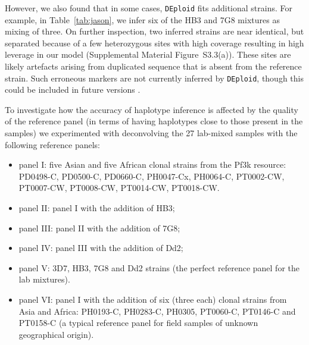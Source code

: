 \documentclass{bioinfo}
\begin{document}
However, we also found that in some cases, \texttt{DEploid} fits additional strains. For example, in Table~\ref{tab:jason}, we infer six of the HB3 and 7G8 mixtures as mixing of three.  On further inspection, two inferred strains are near identical, but separated because of a few heterozygous sites with high coverage resulting in high leverage in our model (Supplemental Material Figure~S3.3(a)). These sites are likely artefacts arising from duplicated sequence that is absent from the reference strain.  Such erroneous markers are not currently inferred by \texttt{DEploid}, though this could be included in future versions .

To investigate how the accuracy of haplotype inference is affected by the quality of the reference panel (in terms of having haplotypes close to those present in the samples) we experimented with deconvolving the 27 lab-mixed samples with the following reference panels:

\begin{itemize}

\item panel I: five Asian and five African clonal strains from the Pf3k\citep{Pf3k2016} resource: {\textmd PD0498-C}, {\textmd PD0500-C}, {\textmd PD0660-C}, {\textmd PH0047-Cx}, {\textmd PH0064-C}, {\textmd PT0002-CW}, {\textmd PT0007-CW}, {\textmd PT0008-CW}, {\textmd PT0014-CW}, {\textmd PT0018-CW}.

\item panel II: panel I with the addition of HB3;

\item panel III: panel II with the addition of 7G8;

\item panel IV: panel III with the addition of Dd2;

\item panel V: 3D7, HB3, 7G8 and Dd2 strains (the perfect reference panel for the lab mixtures).

\item panel VI: panel I with the addition of six (three each) clonal strains from Asia and Africa: {\textmd PH0193-C}, {\textmd PH0283-C}, {\textmd PH0305}, {\textmd PT0060-C}, {\textmd PT0146-C} and {\textmd PT0158-C} (a typical reference panel for field samples of unknown geographical origin).

\end{itemize}
\end{document}
